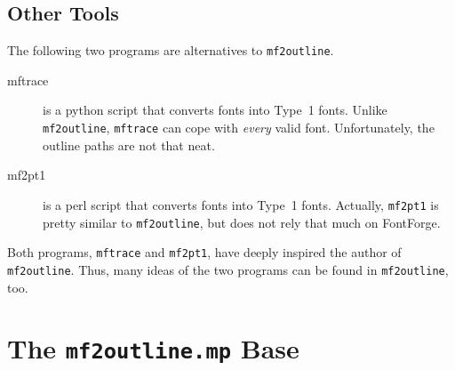 \documentclass{scrartcl}
\begin{document}
\subsection{Other Tools}
%
The following two programs are alternatives to \verb|mf2outline|.
%
\begin{description}
	\item[mftrace] is a python script that converts \MF{} fonts into Type~1 fonts. Unlike \verb|mf2outline|, \verb|mftrace| can cope with \emph{every} valid \MF{} font. Unfortunately, the outline paths are not that neat.
	\item[mf2pt1] is a perl script that converts \MF{} fonts into Type~1 fonts. Actually, \verb|mf2pt1| is pretty similar to \verb|mf2outline|, but does not rely that much on FontForge.
\end{description}
%
Both programs, \verb|mftrace| and \verb|mf2pt1|, have deeply inspired the author of \verb|mf2outline|. Thus, many ideas of the two programs can be found in \verb|mf2outline|, too.
%
\section{The \texttt{mf2outline.mp} Base}
%
\end{document}
